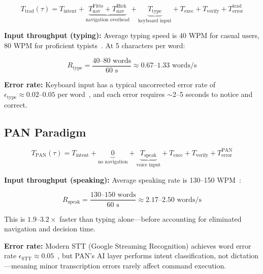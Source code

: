 \documentclass[11pt, a4paper]{article}
\begin{document}
\begin{equation}
  T_{\text{trad}}(\tau) = T_{\text{intent}} + \underbrace{T_{\text{nav}}^{\text{Fitts}} + T_{\text{nav}}^{\text{Hick}}}_{\text{navigation overhead}} + \underbrace{T_{\text{type}}}_{\text{keyboard input}} + T_{\text{exec}} + T_{\text{verify}} + T_{\text{error}}^{\text{trad}}
\end{equation}

\textbf{Input throughput (typing):}
Average typing speed is 40 WPM for casual users, 80 WPM for proficient
typists~\cite{dhakal2018}. At 5 characters per word:

\begin{equation}
  R_{\text{type}} = \frac{40 \text{--} 80 \text{ words}}{60 \text{ s}} \approx 0.67 \text{--} 1.33 \text{ words/s}
\end{equation}

\textbf{Error rate:} Keyboard input has a typical uncorrected error rate of
$\epsilon_{\text{type}} \approx 0.02\text{--}0.05$ per word~\cite{wobbrock2006},
and each error requires $\sim$2--5 seconds to notice and correct.

\subsection{PAN Paradigm}

\begin{equation}
  T_{\text{PAN}}(\tau) = T_{\text{intent}} + \underbrace{0}_{\text{no navigation}} + \underbrace{T_{\text{speak}}}_{\text{voice input}} + T_{\text{exec}} + T_{\text{verify}} + T_{\text{error}}^{\text{PAN}}
\end{equation}

\textbf{Input throughput (speaking):}
Average speaking rate is 130--150 WPM~\cite{williams1998}:

\begin{equation}
  R_{\text{speak}} = \frac{130 \text{--} 150 \text{ words}}{60 \text{ s}} \approx 2.17 \text{--} 2.50 \text{ words/s}
\end{equation}

This is $\mathbf{1.9\text{--}3.2\times}$ faster than typing alone---before
accounting for eliminated navigation and decision time.

\textbf{Error rate:} Modern STT (Google Streaming Recognition) achieves word
error rate $\epsilon_{\text{STT}} \approx 0.05$~\cite{google2023}, but PAN's AI
layer performs intent classification, not dictation---meaning minor transcription
errors rarely affect command execution.
\end{document}
